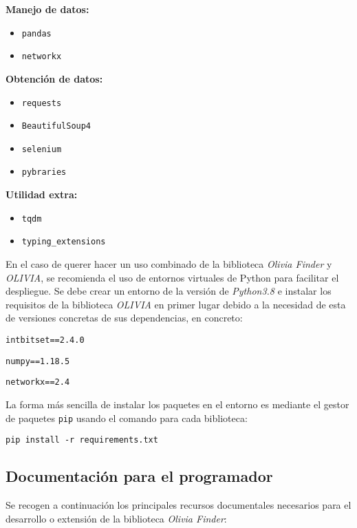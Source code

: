 \textbf{Manejo de datos:}
\begin{itemize}
    \item \texttt{pandas}
    \item \texttt{networkx}
\end{itemize}

\textbf{Obtención de datos:}
\begin{itemize}
    \item \texttt{requests}
    \item \texttt{BeautifulSoup4}
    \item \texttt{selenium}
    \item \texttt{pybraries}
\end{itemize}

\textbf{Utilidad extra:}
\begin{itemize}
    \item \texttt{tqdm}
    \item \texttt{typing\_extensions}
\end{itemize}

En el caso de querer hacer un uso combinado de la biblioteca \textit{Olivia Finder} y \textit{OLIVIA}, se recomienda el uso de entornos
virtuales de Python para facilitar el despliegue. Se debe crear un entorno de la versión de \textit{Python3.8} e instalar los
requisitos de la biblioteca \textit{OLIVIA} en primer lugar debido a la necesidad de esta de versiones concretas de sus
dependencias, en concreto:

\begin{center}

    \texttt{intbitset==2.4.0}

    \texttt{numpy==1.18.5}

    \texttt{networkx==2.4}

\end{center}

La forma más sencilla de instalar los paquetes en el entorno es mediante el gestor de paquetes \texttt{pip} usando el
comando para cada biblioteca:

\begin{center}
    \texttt{pip install -r requirements.txt}
\end{center}

\subsection{Documentación para el programador}

Se recogen a continuación los principales recursos documentales necesarios para el desarrollo o extensión de la biblioteca \textit{Olivia Finder}:


